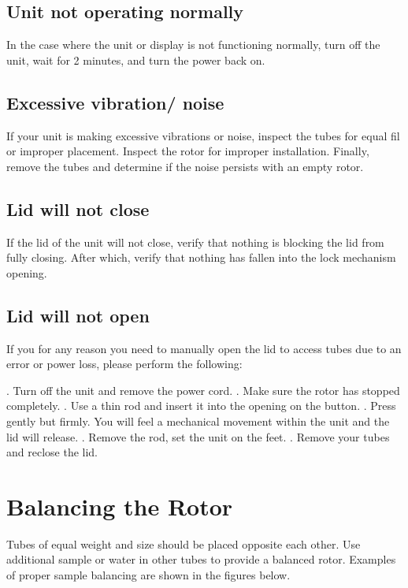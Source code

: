 \documentclass[12pt]{../SOP3_beta}
\begin{document}
\subsection*{Unit not operating normally}

\NP In the case where the unit or display is not functioning normally, turn off the unit, wait for 2 minutes, and turn the power back on. 

\subsection*{Excessive vibration/ noise}

\NP If your unit is making excessive vibrations or noise, inspect the tubes for equal fil or improper placement. Inspect the rotor for improper installation. Finally, remove the tubes and determine if the noise persists with an empty rotor. 

\subsection*{Lid will not close}

\NP If the lid of the unit will not close, verify that nothing is blocking the lid from fully closing. After which, verify that nothing has fallen into the lock mechanism opening. 

\subsection*{Lid will not open}

\NP If you for any reason you need to manually open the lid to access tubes due to an error or power loss, please perform the following:

. Turn off the unit and remove the power cord.
. Make sure the rotor has stopped completely.
. Use a thin rod and insert it into the opening on the button.
. Press gently but firmly. You will feel a mechanical movement within the unit and the lid will release.
. Remove the rod, set the unit on the feet.
. Remove your tubes and reclose the lid. 

\section{Balancing the Rotor}

\NP Tubes of equal weight and size should be placed opposite each other. Use additional sample or water in other tubes to provide a balanced rotor. Examples of proper sample balancing are shown in the figures below. 
\end{document}
